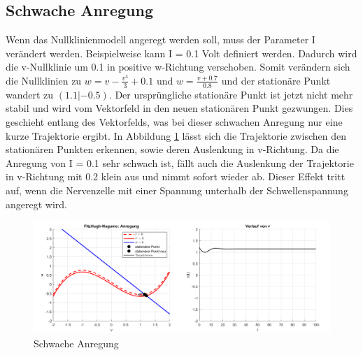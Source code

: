 \begin{refsection}
\subsection{Schwache Anregung}
Wenn das Nullklinienmodell angeregt werden soll, muss der Parameter I verändert werden.
Beispielweise kann I = 0.1 Volt definiert werden.
Dadurch wird die v-Nullklinie um 0.1 in positive w-Richtung verschoben.
Somit verändern sich die Nullklinien zu \( w = v - \frac{v^3}{3} + 0.1\)
und \(w = \frac{v + 0.7}{0.8}\) und der stationäre Punkt wandert zu \((1.1 |-0.5)\).
Der ursprüngliche stationäre Punkt ist jetzt nicht mehr stabil und wird vom Vektorfeld in den neuen stationären Punkt
gezwungen.
Dies geschieht entlang des Vektorfelds, was bei dieser schwachen Anregung nur eine kurze Trajektorie ergibt.
In Abbildung \ref{fig:schwacheAnregung} lässt sich die Trajektorie zwischen den stationären Punkten erkennen, sowie
deren Auslenkung in v-Richtung.
Da die Anregung von I = 0.1 sehr schwach ist, fällt auch die Auslenkung der Trajektorie in v-Richtung mit 0.2 klein aus und
nimmt sofort wieder ab. 
Dieser Effekt tritt auf, wenn die Nervenzelle mit einer Spannung unterhalb der Schwellenspannung angeregt wird.
\begin{figure}[H]
    \centering
    \includegraphics[width=\textwidth]{papers/nerven/Bilder/schwacheAnregung.png}
    \caption{Schwache Anregung}
    \label{fig:schwacheAnregung}
\end{figure}

\end{refsection}
